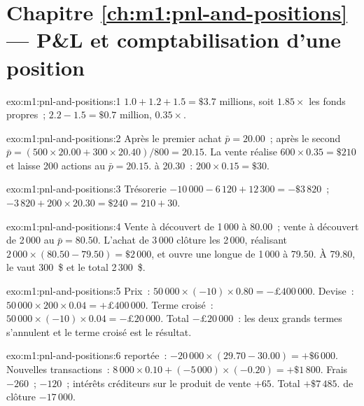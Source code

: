 \section*{Chapitre \ref{ch:m1:pnl-and-positions} --- P\&L et comptabilisation d'une position}

\begin{solution}{exo:m1:pnl-and-positions:1}
 $1.0 + 1.2 + 1.5 = \$3.7$ millions, soit $1.85\times$ les fonds propres~;  $2.2 - 1.5
= \$0.7$ million, $0.35\times$.
\end{solution}

\begin{solution}{exo:m1:pnl-and-positions:2}
Après le premier achat $\bar p = 20.00$~; après le second $\bar p =
(500\times20.00 + 300\times20.40)/800 = 20.15$. La vente réalise $600\times
0.35 = \$210$ et laisse 200 actions au  $\bar p = 20.15$.  à 20.30~:
$200 \times 0.15 = \$30$.
\end{solution}

\begin{solution}{exo:m1:pnl-and-positions:3}
Trésorerie $-10\,000 - 6\,120 + 12\,300 = -\$3\,820$~; $-3\,820 + 200\times20.30 =
\$240 = 210 + 30$.
\end{solution}

\begin{solution}{exo:m1:pnl-and-positions:4}
Vente à découvert de 1\,000 à 80.00~; vente à découvert de 2\,000 au $\bar p = 80.50$. L'achat de
3\,000 clôture les 2\,000, réalisant $2\,000\times(80.50-79.50) = \$2\,000$,
et ouvre une  longue de 1\,000 à 79.50. À 79.80, le  vaut 300~\$ et le
total 2\,300~\$.
\end{solution}

\begin{solution}{exo:m1:pnl-and-positions:5}
Prix~: $50\,000\times(-10)\times0.80 = -\pounds400\,000$. Devise~:
$50\,000\times200\times0.04 = +\pounds400\,000$. Terme croisé~:
$50\,000\times(-10)\times0.04 = -\pounds20\,000$. Total $-\pounds20\,000$~:
les deux grands termes s'annulent et le terme croisé est le résultat.
\end{solution}

\begin{solution}{exo:m1:pnl-and-positions:6}
 reportée~: $-20\,000\times(29.70-30.00) = +\$6\,000$. Nouvelles transactions~:
$8\,000\times0.10 + (-5\,000)\times(-0.20) = +\$1\,800$. Frais $-260$~;  $-120$~; intérêts créditeurs sur le produit de vente $+65$. Total $+\$7\,485$.  de clôture
$-17\,000$.
\end{solution}

